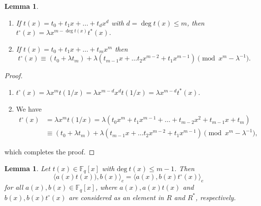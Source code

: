 \documentclass[12 pt]{extarticle}
\numberwithin{equation}{section}
\newtheorem{lemma}[theorem]{Lemma}
\theoremstyle{definition}
\begin{document}
\begin{lemma}\label{properties}
\begin{enumerate}[(1)]
    \item  If $t(x)=t_0+t_1x+\dots+t_dx^d$ with  $d=\deg t(x) \leq m$, then $t^\circ(x)=\lambda x^{m-\deg t(x)} t^*(x)$.
 \item If $t(x)=t_0+t_1x+\dots+t_mx^m$ then $$t^\circ(x) \equiv (t_0+\lambda t_m)+ \lambda (t_{m-1}x+\dots t_2x^{m-2}+t_1x^{m-1})\pmod {x^m-\lambda^{-1}}.$$
   \end{enumerate}
\end{lemma}
\begin{proof}
\begin{enumerate}[(1)]
    \item  $t^{\circ}(x)=\lambda x^m t(1/x)=\lambda x^{m-d}x^dt(1/x)=\lambda x^{m-d}t^*(x)$.
 \item We have \begin{equation*}
 \begin{split}
   t^\circ(x)&=\lambda x^mt(1/x)=\lambda (t_0x^m+t_1x^{m-1}+\dots+t_{m-2}x^2+t_{m-1}x+t_m)\\
 &\equiv (t_0+\lambda t_m)+ \lambda (t_{m-1}x+\dots t_2x^{m-2}+t_1x^{m-1})\pmod {x^m-\lambda^{-1}},
 \end{split}
 \end{equation*}
      \end{enumerate}
which completes the proof.
\end{proof}


\begin{lemma}\label{hat}
 Let $t(x)\in \mathbb{F}_q[x]$ with $\text{deg}\ t(x)\leq m-1$. Then 
 \begin{equation}
     \langle a(x)t(x)),b(x)\rangle_e=\langle a(x), b(x)t^{\circ}(x)\rangle_e
 \end{equation} for all $a(x),b(x)\in \mathbb{F}_q[x]$, where $a(x), a(x)t(x)$ and $b(x), b(x)t^{\circ}(x)$ are considered as an element in $R$ and $R^*$, respectively.
\end{lemma}
\end{document}
